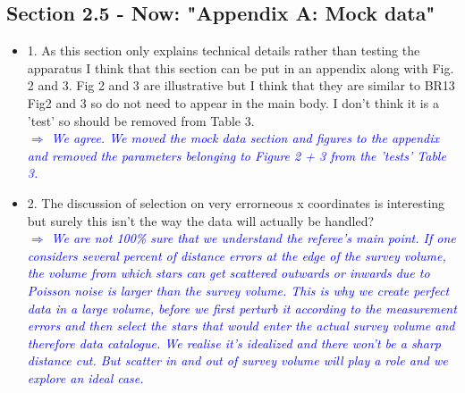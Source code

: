 \documentclass[10pt,a4paper]{article}
\newcommand{\Comment}[1]{\textsl{\textcolor{Blue}{$\Longrightarrow$ {#1}}}}
\begin{document}
\subsection{Section 2.5 - Now: "Appendix A: Mock data"}
\begin{itemize}
\item 1. As this section only explains technical details rather than testing the apparatus I think that this section can be put in an appendix along with Fig. 2 and 3. Fig 2 and 3 are illustrative but I think that they are similar to BR13 Fig2 and 3 so do not need to appear in the main body. I don't think it is a 'test' so should be removed from Table 3. \\\Comment{We agree. We moved the mock data section and figures to the appendix and removed the parameters belonging to Figure 2 + 3 from the 'tests' Table 3.}
\item 2. The discussion of selection on very errorneous x coordinates is interesting but surely this isn't the way the data will actually be handled?
\\\Comment{We are not 100\% sure that we understand the referee's main point. If one considers several percent of distance errors at the edge of the survey volume, the volume from which stars can get scattered outwards or inwards due to Poisson noise is larger than the survey volume. This is why we create perfect data in a large volume, before we first perturb it according to the measurement errors and then select the stars that would enter the actual survey volume and therefore data catalogue. We realise it's idealized and there won't be a sharp distance cut. But scatter in and out of survey volume will play a role and we explore an ideal case.}
\end{itemize}
\end{document}

